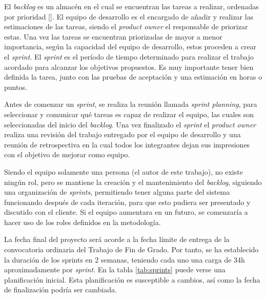 El \textit{backlog} es un almacén en el cual se encuentran las tareas a realizar, ordenadas por prioridad [\cite{93}]. El equipo de desarrollo es el encargado de añadir y realizar las estimaciones de las tareas, siendo el \textit{product owner} el responsable de priorizar estas. Una vez las tareas se encuentran priorizadas de mayor a menor importancia, según la capacidad del equipo de desarrollo, estos proceden a crear el \textit{sprint}. El \textit{sprint} es el período de tiempo determinado para realizar el trabajo acordado para alcanzar los objetivos propuestos. Es muy importante tener bien definida la tarea, junto con las pruebas de aceptación y una estimación en horas o puntos.

Antes de comenzar un \textit{sprint}, se realiza la reunión llamada \textit{sprint planning}, para seleccionar y comunicar qué tareas es capaz de realizar el equipo, las cuales son seleccionadas del inicio del \textit{backlog}. Una vez finalizado el \textit{sprint} el \textit{product owner} realiza una revisión del trabajo entregado por el equipo de desarrollo y una reunión de retrospectiva en la cual todos los integrantes dejan sus impresiones con el objetivo de mejorar como equipo.

Siendo el equipo solamente una persona (el autor de este trabajo), no existe ningún rol, pero se mantiene la creación y el mantenimiento del \textit{backlog}, siguiendo una organización de \textit{sprints}, permitiendo tener alguna parte del sistema funcionando después de cada iteración, para que esto pudiera ser presentado y discutido con el cliente. Si el equipo aumentara en un futuro, se comenzaría a hacer uso de los roles definidos en la metodología.

La fecha final del proyecto será acorde a la fecha límite de entrega de la convocatoria ordinaria del Trabajo de Fin de Grado. Por tanto, se ha establecido la duración de los sprints en 2 semanas, teniendo cada uno una carga de 34h aproximadamente por \textit{sprint}. En la tabla \ref{tab:sprints} puede verse una planificación inicial. Esta planificación es susceptible a cambios, así como la fecha de finalización podría ser cambiada.



